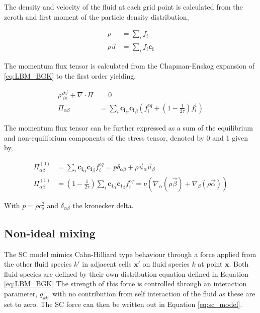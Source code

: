The density and velocity of the fluid at each grid point is calculated from the zeroth and first moment of the particle density
distribution, 

\begin{equation}
    \begin{split}
        \rho &= \sum_i f_i \\
        \rho\vec{u} &= \sum_i f_i \mathbf{c_i}
    \end{split}
\end{equation}

The momentum flux tensor is calculated from the Chapman-Enskog expansion of \ref{eq:LBM_BGK} to the first order yielding,

\begin{equation}
    \begin{split}
        \rho\frac{\partial \vec{v}}{\partial t} + \nabla \cdot \Pi &= 0 \\
        \Pi_{\alpha \beta} &= \sum_i \mathbf{c_i}_\alpha \mathbf{c_i}_\beta (f_i^{eq} + (1 - \frac{1}{2 \tau})f_i^1)
    \end{split}
\end{equation}

The momentum flux tensor can be further expressed as a sum of the equilibrium and non-equilibrium components of the stress tensor, denoted by 0 and 1 given by,

\begin{equation}
    \begin{split}
        \Pi^{(0)}_{\alpha \beta} &= \sum_i \mathbf{c_i}_\alpha \mathbf{c_i}_\beta f_i^{eq} = p \delta_{\alpha \beta} + \rho \vec{u}_\alpha \vec{u}_\beta \\
        \Pi^{(1)}_{\alpha \beta} &= (1 - \frac{1}{2 \tau})\sum_i \mathbf{c_i}_\alpha \mathbf{c_i}_\beta f_i^{eq} = \nu (\nabla_{\alpha}(\rho \vec{\beta}) + \nabla_{\beta}(\rho \vec{\alpha}))
    \end{split}
\end{equation}

With $p = \rho c_s^2$ and $\delta_{\alpha \beta}$ the kronecker delta.

\subsection{Non-ideal mixing}
\label{section:lbm_non_ideal_mixing}

The SC model mimics Cahn-Hilliard type behaviour through a force applied from the other fluid species $k'$ in adjacent 
cells $\mathbf{x'}$ on fluid species $k$ at point $\mathbf{x}$. \cite{shan_lattice_1993, shan_simulation_1994, 
shan_multicomponent_1995, he_discrete_1998, jansen_bijels_2011, chin_lattice_2002} Both fluid species are defined
by their own distribution equation defined in Equation \ref{eq:LBM_BGK} The strength of this force is controlled 
through an interaction parameter, $g_{kk'}$ with no contribution from self interaction of the fluid as these are 
set to zero. The SC force can then be written out in Equation \ref{eq:sc_model}.


